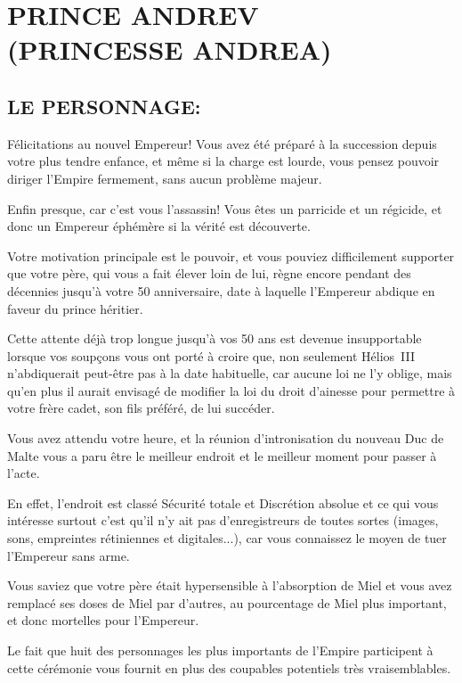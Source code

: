 \documentclass[14pt,twocolumn]{extarticle}
\begin{document}
\section{PRINCE ANDREV\\(PRINCESSE ANDREA)}

\subsection{LE PERSONNAGE:}

Félicitations au nouvel Empereur! Vous avez été préparé à la succession depuis
votre plus tendre enfance, et même si la charge est lourde, vous pensez pouvoir
diriger l'Empire fermement, sans aucun problème majeur.

Enfin presque, car c'est vous l'assassin! Vous êtes un parricide et un
régicide, et donc un Empereur éphémère si la vérité est découverte.

Votre motivation principale est le pouvoir, et vous pouviez difficilement
supporter que votre père, qui vous a fait élever loin de lui, règne encore
pendant des décennies jusqu'à votre 50\ieme{} anniversaire, date à laquelle
l'Empereur abdique en faveur du prince héritier.

Cette attente déjà trop longue jusqu'à vos 50 ans est devenue insupportable
lorsque vos soupçons vous ont porté à croire que, non seulement Hélios~III
n'abdiquerait peut-être pas à la date habituelle, car aucune loi ne l'y oblige,
mais qu'en plus il aurait envisagé de modifier la loi du droit d'ainesse pour
permettre à votre frère cadet, son fils préféré, de lui succéder.

Vous avez attendu votre heure, et la réunion d'intronisation du nouveau Duc de
Malte vous a paru être le meilleur endroit et le meilleur moment pour passer à
l'acte.

En effet, l'endroit est classé \og Sécurité totale et Discrétion absolue\fg{}
et ce qui vous intéresse surtout c'est qu'il n'y ait pas d'enregistreurs de
toutes sortes (images, sons, empreintes rétiniennes et digitales...), car vous
connaissez le moyen de tuer l'Empereur sans arme.

Vous saviez que votre père était hypersensible à l'absorption de Miel et vous
avez remplacé ses doses de Miel par d'autres, au pourcentage de Miel plus
important, et donc mortelles pour l'Empereur.

Le fait que huit des personnages les plus importants de l'Empire participent à
cette cérémonie vous fournit en plus des coupables potentiels très
vraisemblables.
\end{document}
